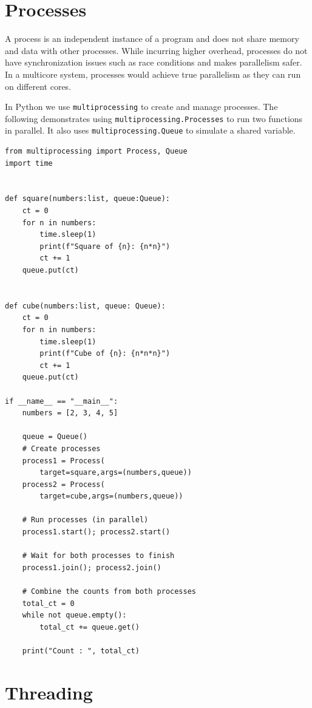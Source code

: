 \documentclass[oneside,11pt,dvipsnames]{book}
\newcommand{\code}[1]{\texttt{#1}}
\begin{document}
\section{Processes}\label{sec:processes}
A process is an independent instance of a program and does not share memory and data with other processes. While incurring higher overhead, processes do not have synchronization issues such as race conditions and makes parallelism safer. In a multicore system, processes would achieve true parallelism as they can run on different cores. 

In Python we use \code{multiprocessing} to create and manage processes. The following demonstrates using \code{multiprocessing.Processes} to run two functions in parallel. It also uses \code{multiprocessing.Queue} to simulate a shared variable.

\begin{lstlisting}[multicols=2]
from multiprocessing import Process, Queue
import time


def square(numbers:list, queue:Queue):
    ct = 0
    for n in numbers:
        time.sleep(1)
        print(f"Square of {n}: {n*n}")
        ct += 1
    queue.put(ct)


def cube(numbers:list, queue: Queue):
    ct = 0
    for n in numbers:
        time.sleep(1)
        print(f"Cube of {n}: {n*n*n}")
        ct += 1
    queue.put(ct)

if __name__ == "__main__":
    numbers = [2, 3, 4, 5]

    queue = Queue()
    # Create processes
    process1 = Process(
        target=square,args=(numbers,queue))
    process2 = Process(
        target=cube,args=(numbers,queue))

    # Run processes (in parallel)
    process1.start(); process2.start()

    # Wait for both processes to finish
    process1.join(); process2.join()

    # Combine the counts from both processes
    total_ct = 0
    while not queue.empty():
        total_ct += queue.get()

    print("Count : ", total_ct)
\end{lstlisting}

\section{Threading}\label{sec:threads}

\end{document}
